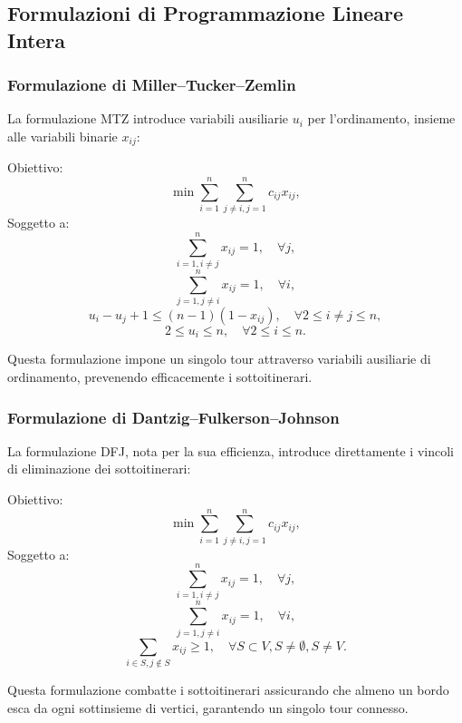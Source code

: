 \subsection{Formulazioni di Programmazione Lineare Intera}

\subsubsection{Formulazione di Miller–Tucker–Zemlin}

La formulazione \gls{MTZ} introduce variabili ausiliarie \(u_i\) per l'ordinamento, insieme alle variabili binarie \(x_{ij}\):

Obiettivo:
\[
	\min \sum_{i=1}^{n} \sum_{j \ne i, j=1}^{n} c_{ij} x_{ij},
\]
Soggetto a:
\[
	\sum_{i=1, i \ne j}^{n} x_{ij} = 1, \quad \forall j,
\]
\[
	\sum_{j=1, j \ne i}^{n} x_{ij} = 1, \quad \forall i,
\]
\[
	u_i - u_j + 1 \le (n-1)(1 - x_{ij}), \quad \forall 2 \le i \ne j \le n,
\]
\[
	2 \le u_i \le n, \quad \forall 2 \le i \le n.
\]

Questa formulazione impone un singolo tour attraverso variabili ausiliarie di ordinamento, prevenendo efficacemente i sottoitinerari.

\subsubsection{Formulazione di Dantzig–Fulkerson–Johnson}

La formulazione DFJ, nota per la sua efficienza, introduce direttamente i vincoli di eliminazione dei sottoitinerari:

Obiettivo:
\[
	\min \sum_{i=1}^{n} \sum_{j \ne i, j=1}^{n} c_{ij} x_{ij},
\]
Soggetto a:
\[
	\sum_{i=1, i \ne j}^{n} x_{ij} = 1, \quad \forall j,
\]
\[
	\sum_{j=1, j \ne i}^{n} x_{ij} = 1, \quad \forall i,
\]
\[
	\sum_{i \in S, j \notin S} x_{ij} \ge 1, \quad \forall S \subset V, S \ne \emptyset, S \ne V.
\]


Questa formulazione combatte i sottoitinerari assicurando che almeno un bordo esca da ogni sottinsieme di vertici, garantendo un singolo tour connesso.


